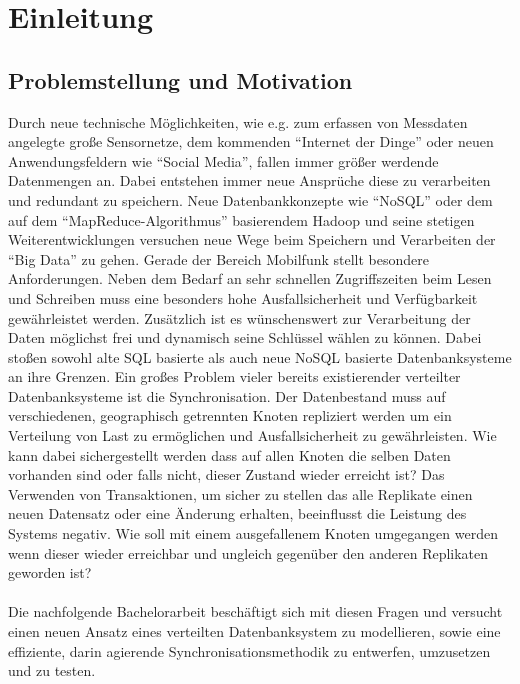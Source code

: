 \documentclass[a4paper,11pt,oneside,%
headsepline,												%
footsepline,												%
bibtotocnumbered									%
]{scrreprt}
\begin{document}
\chapter{Einleitung}
			
\section{Problemstellung und Motivation}	
Durch neue technische Möglichkeiten, wie e.g. zum erfassen von Messdaten angelegte große Sensornetze, dem kommenden \enquote{Internet der Dinge} oder neuen Anwendungsfeldern wie \enquote{Social Media}, fallen immer größer werdende Datenmengen an. Dabei entstehen immer neue Ansprüche diese zu verarbeiten und redundant zu speichern. Neue Datenbankkonzepte wie \enquote{NoSQL}  oder dem auf dem \enquote{MapReduce-Algorithmus} basierendem Hadoop und seine stetigen Weiterentwicklungen versuchen neue Wege beim Speichern und Verarbeiten der \enquote{Big Data} zu gehen. Gerade der Bereich Mobilfunk stellt besondere Anforderungen. Neben dem Bedarf an sehr schnellen Zugriffszeiten beim Lesen und Schreiben muss eine besonders hohe Ausfallsicherheit und Verfügbarkeit gewährleistet werden. Zusätzlich ist es wünschenswert zur Verarbeitung der Daten möglichst frei und dynamisch seine Schlüssel wählen zu können.
Dabei stoßen sowohl alte SQL basierte als auch neue NoSQL basierte Datenbanksysteme an ihre Grenzen. Ein großes Problem vieler bereits existierender verteilter Datenbanksysteme ist die Synchronisation. Der Datenbestand muss auf verschiedenen, geographisch getrennten Knoten repliziert werden um ein Verteilung von Last zu ermöglichen und Ausfallsicherheit zu gewährleisten. Wie kann dabei sichergestellt werden dass auf allen Knoten die selben Daten vorhanden sind oder falls nicht, dieser Zustand wieder erreicht ist? Das Verwenden von Transaktionen, um sicher zu stellen das alle Replikate einen neuen Datensatz oder eine Änderung erhalten, beeinflusst die Leistung des Systems negativ. Wie soll mit einem ausgefallenem Knoten umgegangen werden wenn dieser wieder erreichbar und ungleich gegenüber den anderen Replikaten geworden ist? \\\\

Die nachfolgende Bachelorarbeit beschäftigt sich mit diesen Fragen und versucht einen neuen Ansatz eines verteilten Datenbanksystem zu modellieren, sowie eine effiziente, darin agierende Synchronisationsmethodik zu entwerfen, umzusetzen und zu testen.
\end{document}
